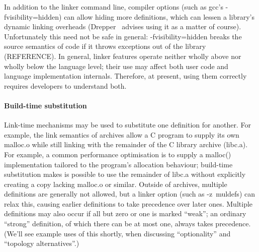 In addition to the linker command line, 
compiler options (such as \textsf{gcc}'s \textsf{-fvisibility=hidden})
can allow hiding more definitions,
which can lessen a library's dynamic linking overheads
(Drepper~\citet{drepper} advises using it as a matter of course).
Unfortunately this need not be safe in general: \textsf{-fvisibility=hidden}
breaks the source semantics of \Cplusplus{} code if it throws exceptions 
out of the library (REFERENCE).
In general, linker features operate neither wholly above nor wholly below the language level; 
their use may affect both user code and language implementation internals.
Therefore, at present, using them correctly requires developers to understand both.


\paragraph{Build-time substitution}
Link-time mechanisms may be used to substitute one definition for another.
For example, the link semantics of archives allow a C program
to supply its own \textsf{malloc.o} while still linking with 
the remainder of the C library archive (\textsf{libc.a}).
For example, a common performance optimisation is to supply a 
\textsf{malloc()} implementation tailored to the program's allocation behaviour; 
build-time substitution makes is possible to use the remainder of \textsf{libc.a} 
without explicitly creating a copy lacking \textsf{malloc.o} or similar.
Outside of archives, multiple definitions are generally not allowed,
but a linker option (such as \textsf{-z~muldefs}) can relax this, 
causing earlier definitions to take precedence over later ones.
Multiple definitions may also occur if all but zero or one is marked ``weak'';
an ordinary ``strong'' definition, of which there can be at most one, always takes precedence.
(We'll see example uses of this shortly, when discussing 
``optionality'' and ``topology alternatives''.)

